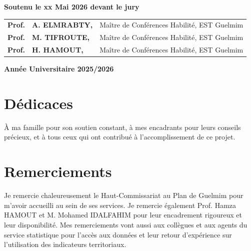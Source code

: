 \documentclass[12pt,a4paper,oneside]{report}
\begin{document}
\begin{titlepage}
\begin{center}
\vspace{0.55cm}

{\small\bfseries Soutenu le xx Mai 2026 devant le jury}

\vspace{0.30cm}

\footnotesize
\begin{tabular}{lll}
\textbf{Prof.} & \textbf{A. ELMRABTY,} & Maître de Conférences Habilité, EST Guelmim \\
\textbf{Prof.} & \textbf{M. TIFROUTE,} & Maître de Conférences Habilité, EST Guelmim \\
\textbf{Prof.} & \textbf{H. HAMOUT,} & Maître de Conférences Habilité, EST Guelmim
\end{tabular}

\vfill

{\small\bfseries\color{ReportText} Année Universitaire 2025/2026}

\end{center}

\restoregeometry
\end{titlepage}



\chapter*{Dédicaces}
À ma famille pour son soutien constant, à mes encadrants pour leurs conseils précieux, et à tous ceux qui ont contribué à l'accomplissement de ce projet.

\chapter*{Remerciements}
Je remercie chaleureusement le Haut-Commissariat au Plan de Guelmim pour m'avoir accueilli au sein de ses services. Je remercie également Prof. Hamza HAMOUT et M. Mohamed IDALFAHIM pour leur encadrement rigoureux et leur disponibilité. Mes remerciements vont aussi aux collègues et aux agents du service statistique pour l'accès aux données et leur retour d'expérience sur l'utilisation des indicateurs territoriaux.
\end{document}
